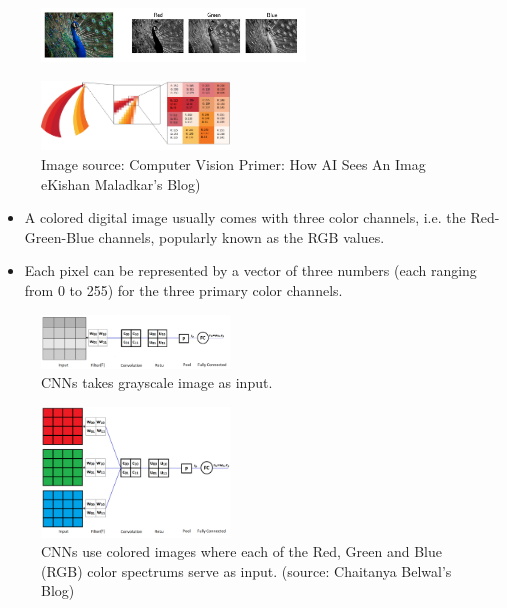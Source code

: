 \begin{vbframe}

 \begin{figure}
    \centering
    \includegraphics[width=7cm]{figure/RGB.jpeg}
  \end{figure}

 \begin{figure}
    \centering
    \includegraphics[width=5cm]{figure/RGB-1.png}
    \caption{\tiny Image source: Computer Vision Primer: How AI Sees An Imag eKishan Maladkar's Blog)}
  \end{figure}

\begin{itemize}
       \item A colored digital image usually comes with three color channels, i.e. the Red-Green-Blue channels, popularly known as the RGB values.   
        \item Each pixel can be represented by a vector of three numbers (each ranging from 0 to 255) for the three primary color channels.
      
\end{itemize}
 \begin{figure}
    \centering
    \includegraphics[width=5cm]{figure/1channel.png}
    \caption{\tiny CNNs takes grayscale image as input.}
  \end{figure}


 \begin{figure}
    \centering
    \includegraphics[width=5cm]{figure/3channel.png}
    \caption{\tiny CNNs use colored images where each of the Red, Green and Blue (RGB) color spectrums serve as input. (source: Chaitanya Belwal's Blog)}
  \end{figure}
  
  
\end{vbframe}
